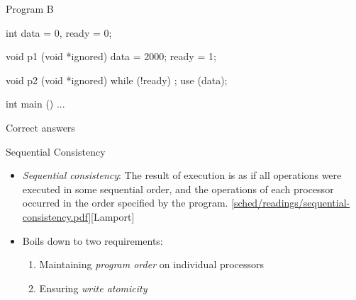 \documentclass[11pt]{beamer}
\begin{document}
\begin{slide}{\hypertarget{prog-b}{Program B}}
\begin{ccode}
  int data = 0, ready = 0;

  void p1 (void *ignored) {
    data = 2000;
    ready = 1;
  }

  void p2 (void *ignored) {
    while (!ready)
      ;
    use (data);
  }

  int main () { ... }
\end{ccode}
\end{slide}

\begin{slide}{Correct answers}
\end{slide}

\begin{slide}{Sequential Consistency}
\begin{itemize}
\item \textit{Sequential consistency}:  The result of execution is as
if all operations were executed in some sequential order, and the
operations of each processor occurred in the order specified by the
program.
\cref{sched/readings/sequential-consistency.pdf}{[Lamport]}
\item Boils down to two requirements:
\begin{enumerate}
  \item Maintaining \textit{program order} on individual processors
  \item Ensuring \textit{write atomicity}
\end{enumerate}
\end{itemize}
\end{slide}
\end{document}
